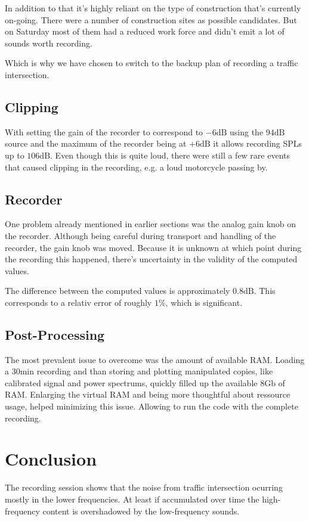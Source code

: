 \documentclass[twocolumn]{article}
\begin{document}
In addition to that it's highly reliant on the type of construction that's currently on-going.
There were a number of construction sites as possible candidates.
But on Saturday most of them had a reduced work force and didn't emit a lot of sounds
worth recording.

Which is why we have chosen to switch to the backup plan of recording a traffic intersection.

\subsection{Clipping}
With setting the gain of the recorder to correspond to $-6 \textrm{dB}$ using the $94 \textrm{dB}$ source
and the maximum of the recorder being at $+6 \textrm{dB}$ it allows recording SPLs up to $106 \textrm{dB}$.
Even though this is quite loud, there were still a few rare events that caused clipping in the recording,
e.g. a loud motorcycle passing by.


\subsection{Recorder}
One problem already mentioned in earlier sections was the analog gain knob on the recorder.
Although being careful during transport and handling of the recorder, the gain knob was moved.
Because it is unknown at which point during the recording this happened, there's uncertainty
in the validity of the computed values.

The difference between the computed values is approximately $0.8 \textrm{dB}$.
This corresponds to a relativ error of roughly $1\%$, which is significant.


\subsection{Post-Processing}
The most prevalent issue to overcome was the amount of available RAM.
Loading a $30\textrm{min}$ recording and than storing and plotting manipulated copies, like calibrated
signal and power spectrums, quickly filled up the available $8\textrm{Gb}$ of RAM.
Enlarging the virtual RAM and being more thoughtful about ressource usage, helped minimizing this
issue. Allowing to run the code with the complete recording.

\section{Conclusion}
The recording session shows that the noise from traffic intersection ocurring mostly in the lower
frequencies.
At least if accumulated over time the high-frequency content is overshadowed by the low-frequency sounds.
\end{document}
